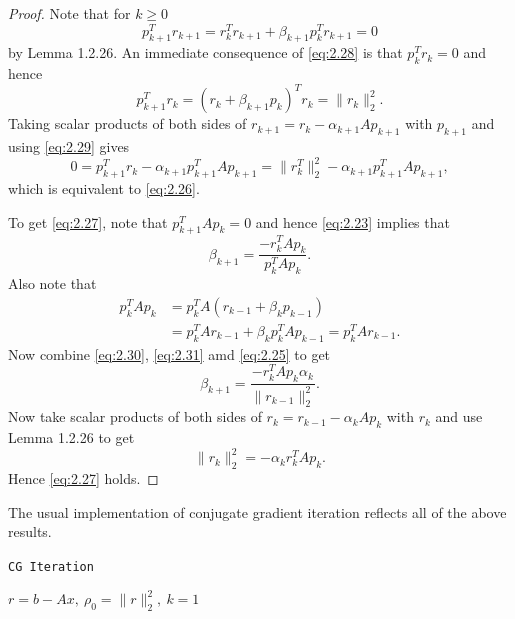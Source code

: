 \begin{proof}
  Note that for $k\geq 0$
  \begin{equation}
    \label{eq:2.28}
    p_{k+1}^Tr_{k+1}=r_k^Tr_{k+1}+\beta_{k+1}p_k^Tr_{k+1}=0
  \end{equation}
  by Lemma 1.2.26. An immediate consequence of \eqref{eq:2.28} is that
  $p_k^Tr_k=0$ and hence
  \begin{equation}
    \label{eq:2.29}
    p_{k+1}^Tr_k = (r_k+\beta_{k+1}p_k)^Tr_{k}= \|r_k\|_2^2.
  \end{equation}
  Taking scalar products of both sides of
  $r_{k+1}=r_k-\alpha_{k+1}Ap_{k+1}$ with $p_{k+1}$ and using
  \eqref{eq:2.29} gives
  $$0=p_{k+1}^Tr_k-\alpha_{k+1}p_{k+1}^TAp_{k+1}=\|r_k^T\|_2^2-
  \alpha_{k+1}p_{k+1}^TAp_{k+1},$$
  which is equivalent to \eqref{eq:2.26}.

  To get \eqref{eq:2.27}, note that $p_{k+1}^TAp_k=0$ and hence
  \eqref{eq:2.23} implies that
  \begin{equation}
    \label{eq:2.30}
    \beta_{k+1}=\frac{-r_k^TAp_k}{p_k^TAp_k}.
  \end{equation}
  Also note that
  \begin{equation}
    \label{eq:2.31}
    \begin{aligned}
      p_k^TAp_k &= p_k^TA(r_{k-1}+\beta_kp_{k-1}) \\
      &=p_k^TAr_{k-1}+\beta_kp_k^TAp_{k-1}=p_{k}^TAr_{k-1}.
    \end{aligned}
  \end{equation}
  Now combine \eqref{eq:2.30}, \eqref{eq:2.31} amd \eqref{eq:2.25} to
  get $$\beta_{k+1}=\frac{-r_k^TAp_k\alpha_k}{\|r_{k-1}\|_2^2}.$$
  Now take scalar products of both sides of $r_k=r_{k-1}-\alpha_kAp_k$
  with $r_k$ and use Lemma 1.2.26 to
  get $$\|r_k\|_2^2=-\alpha_kr_k^TAp_k.$$
  Hence \eqref{eq:2.27} holds.
\end{proof}

\begin{algo}
  The usual implementation of conjugate gradient iteration reflects
  all of the above results.

  \IncMargin{1em}
  \begin{algorithm}[H]
    \caption{\texttt{CG Iteration}}

    \BlankLine
    $r=b-Ax,\ \rho_0=\|r\|_2^2,\ k=1$\;
  \end{algorithm}
  \DecMargin{1em}
\end{algo}

